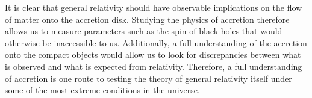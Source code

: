 \par It is clear that general relativity should have observable implications on the flow of matter onto the accretion disk.  Studying the physics of accretion therefore allows us to measure parameters such as the spin of black holes that would otherwise be inaccessible to us.  Additionally, a full understanding of the accretion onto the compact objects would allow us to look for discrepancies between what is observed and what is expected from relativity.  Therefore, a full understanding of accretion is one route to testing the theory of general relativity itself under some of the most extreme conditions in the universe.